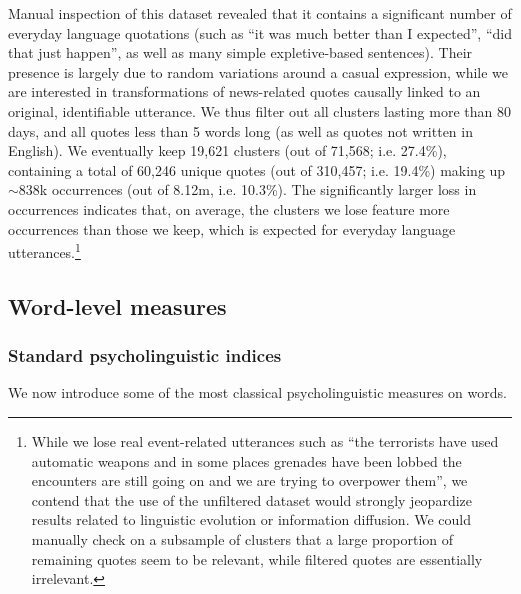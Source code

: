 Manual inspection of this dataset revealed that it contains a significant number of everyday language quotations (such as ``it was much better than I expected'', ``did that just happen'', as well as many simple expletive-based sentences).
Their presence is largely due to random variations around a casual expression, while we are interested in transformations of news-related quotes causally linked to an original, identifiable utterance.
We thus filter out all clusters lasting more than 80 days, and all quotes less than 5 words long  (as well as quotes not written in English).
We eventually keep 19,621 clusters (out of 71,568; i.e. 27.4\%), containing a total of 60,246 unique quotes (out of 310,457; i.e. 19.4\%) making up $\sim$838k occurrences (out of 8.12m, i.e. 10.3\%).
The significantly larger loss in occurrences indicates that, on average, the clusters we lose feature more occurrences than those we keep, which is expected for everyday language utterances.\footnote{While we lose real event-related utterances such as ``the terrorists have used automatic weapons and in some places grenades have been lobbed the encounters are still going on and we are trying to overpower them'', we contend that the use of the unfiltered dataset would strongly jeopardize results related to linguistic evolution or information diffusion. We could manually check on a subsample of clusters that a large proportion of remaining quotes seem to be relevant, while filtered quotes are essentially irrelevant.}

\subsection{Word-level measures}


\subsubsection{Standard psycholinguistic indices}

We now introduce some of the most classical psycholinguistic measures on words.


